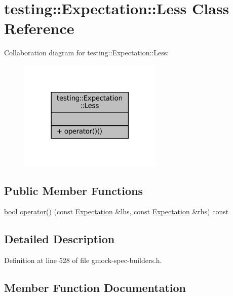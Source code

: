 \hypertarget{classtesting_1_1Expectation_1_1Less}{}\section{testing\+:\+:Expectation\+:\+:Less Class Reference}
\label{classtesting_1_1Expectation_1_1Less}


Collaboration diagram for testing\+:\+:Expectation\+:\+:Less\+:
\nopagebreak
\begin{figure}[H]
\begin{center}
\leavevmode
\includegraphics[width=194pt]{classtesting_1_1Expectation_1_1Less__coll__graph}
\end{center}
\end{figure}
\subsection*{Public Member Functions}
\begin{DoxyCompactItemize}
\item 
\hyperlink{classbool}{bool} \hyperlink{classtesting_1_1Expectation_1_1Less_a821950f0cdd9a6722a26cb45cc65a643}{operator()} (const \hyperlink{classtesting_1_1Expectation}{Expectation} \&lhs, const \hyperlink{classtesting_1_1Expectation}{Expectation} \&rhs) const
\end{DoxyCompactItemize}


\subsection{Detailed Description}


Definition at line 528 of file gmock-\/spec-\/builders.\+h.



\subsection{Member Function Documentation}
\mbox{\label{classtesting_1_1Expectation_1_1Less_a821950f0cdd9a6722a26cb45cc65a643}} 
